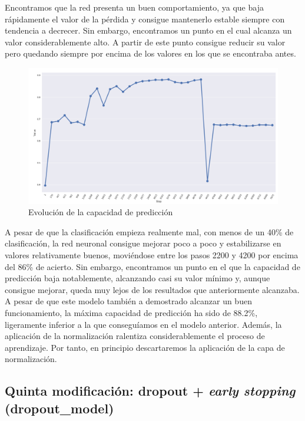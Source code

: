 \documentclass[11pt]{article}
\theoremstyle{plain}
\theoremstyle{definition}
\begin{document}
Encontramos que la red presenta un buen comportamiento, ya que baja
rápidamente el valor de la pérdida y consigue mantenerlo estable
siempre con tendencia a decrecer. Sin embargo, encontramos un punto 
en el cual alcanza un valor considerablemente alto. A partir de este 
punto consigue reducir su valor pero quedando siempre por encima de 
los valores en los que se encontraba antes.

\begin{figure}[H]
  \centering \includegraphics[width=.95\textwidth]{imgs/accuracy_norm}
  \caption{Evolución de la capacidad de predicción}
\end{figure}

A pesar de que la clasificación empieza realmente mal, con menos de un 
40\% de clasificación, la red neuronal consigue mejorar poco a poco y
estabilizarse en valores relativamente buenos, moviéndose entre los 
pasos 2200 y 4200 por encima del 86\% de acierto. Sin embargo, 
encontramos un punto en el que la capacidad de predicción baja 
notablemente, alcanzando casi su valor mínimo y, aunque consigue mejorar,
queda muy lejos de los resultados que anteriormente alcanzaba.\\

A pesar de que este modelo también a demostrado alcanzar un buen 
funcionamiento, la máxima capacidad de predicción ha sido de 88.2\%,
ligeramente inferior a la que conseguíamos en el modelo anterior. Además,
la aplicación de la normalización ralentiza considerablemente el proceso
de aprendizaje. Por tanto, en principio descartaremos la aplicación de
la capa de normalización. 

\subsection{Quinta modificación: dropout + \textit{early stopping}
  (dropout\_model)}
\end{document}
